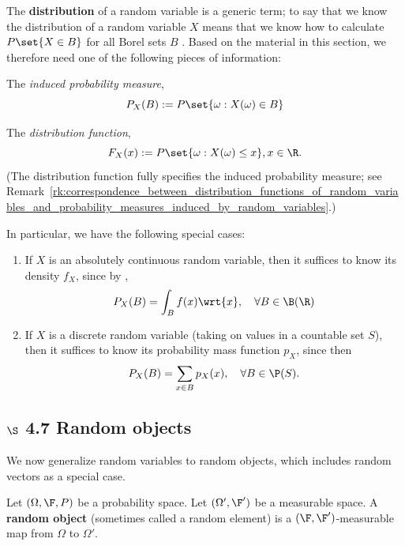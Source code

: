 \documentclass{article} %
\begin{document}
\begin{remark}
The \textbf{distribution} of a random variable is a generic term; to say that we know the distribution of a random variable $X$ means that we know how to calculate $P\set{X \in B}$ for all Borel sets $B$ \cite[pp.185]{ash2000probability}.  Based on the material in this section, we therefore need one of the following pieces of information:
\begin{alphabate}
\item The \textit{induced probability measure}, 
 \[P_X(B) := P\set{\omega : X(\omega) \in B}\]
\item The \textit{distribution function}, 
 	\[F_X(x) := P\set{\omega : X(\omega) \leq x}, x \in \R.\]  (The distribution function fully specifies the induced probability measure; see Remark~\ref{rk:correspondence_between_distribution_functions_of_random_variables_and_probability_measures_induced_by_random_variables}.)		
\end{alphabate}
	
In particular, we have the following special cases:
\begin{enumerate}
\item If $X$ is an absolutely continuous random variable, then it suffices to know its density $f_X$, since by ,
	\[ P_X(B) = \int_B f(x) \wrt{x}, \quad \forall B \in \B(\R)\]	
\item If $X$ is a discrete random variable (taking on values in a countable set $S$), then it suffices to know its probability mass function $p_X$, since then 
     \[ P_X(B) = \sum_{x \in B} p_X(x), \quad \forall B \in \P(S).\]	
\end{enumerate}
\label{rk:distribution_of_a_random_variable}
\end{remark}



\subsection{$\S$ 4.7 Random objects}

We now generalize random variables to random objects, which includes random vectors as a special case. 

\begin{definition}
Let $(\Omega, \F, P)$ be a probability space.  Let $(\Omega', \F')$ be a measurable space.  A \textbf{random object} (sometimes called a random element) is a $(\F,\F')$-measurable map from $\Omega$ to $\Omega'$.
\label{def:random_object}
\end{definition}
\end{document}
